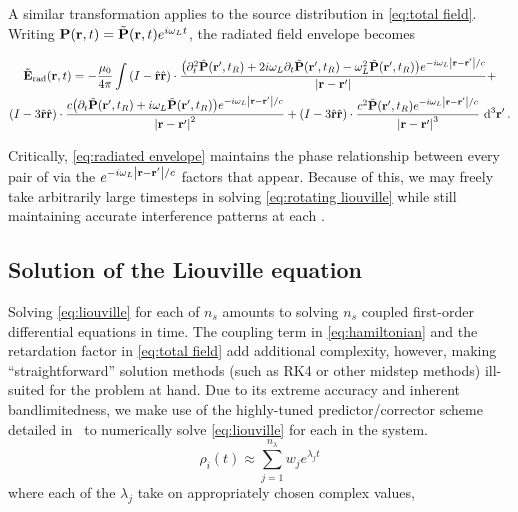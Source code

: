 A similar transformation applies to the source distribution in \cref{eq:total field}.
Writing $\vb{P}(\vb{r}, t) = \tilde{\vb{P}}(\vb{r}, t)e^{i \omega_L t}$, the radiated field envelope becomes
\begin{widetext}
\begin{equation}
  \begin{gathered}
    \tilde{\vb{E}}_\text{rad}(\vb{r}, t) = -\frac{\mu_0}{4\pi} \int 
    \qty(I -  \hat{\vb{r}}\hat{\vb{r}}) \cdot \frac{\qty(\partial_t^2 \tilde{\vb{P}}(\vb{r}', t_R) + 2 i \omega_L \partial_t \tilde{\vb{P}}(\vb{r}', t_R) - \omega_L^2 \tilde{\vb{P}}(\vb{r}', t_R)) e^{-i \omega_L \abs{\vb{r} - \vb{r}'}/c}}{\abs{\vb{r}-\vb{r}'}} + \\
    \qty(I - 3\hat{\vb{r}}\hat{\vb{r}}) \cdot \frac{c\qty(\partial_t \tilde{\vb{P}}(\vb{r}', t_R) + i \omega_L \tilde{\vb{P}}(\vb{r}', t_R))e^{-i \omega_L \abs{\vb{r} - \vb{r}'}/c}}{\abs{\vb{r}-\vb{r}'}^2} +
    \qty(I - 3\hat{\vb{r}}\hat{\vb{r}}) \cdot \frac{c^2   \tilde{\vb{P}}(\vb{r}', t_R)e^{-i \omega_L \abs{\vb{r} - \vb{r}'}/c}}{\abs{\vb{r}-\vb{r}'}^3}
    \, \dd[3]{\vb{r'}}.
  \end{gathered}
  \label{eq:radiated envelope}
\end{equation}
\end{widetext}
Critically, \cref{eq:radiated envelope} maintains the phase relationship between every pair of \qds{} via the $e^{-i \omega_L \abs{\vb{r} - \vb{r}'}/c}$ factors that appear.
Because of this, we may freely take arbitrarily large timesteps in solving \cref{eq:rotating liouville} while still maintaining accurate interference patterns at each \qd{}.




\subsection{Solution of the Liouville equation}

Solving \cref{eq:liouville} for each of $n_s$ \qds{} amounts to solving $n_s$ coupled first-order differential equations in time.
The coupling term in \cref{eq:hamiltonian} and the retardation factor in \cref{eq:total field} add additional complexity, however, making ``straightforward'' solution methods (such as RK4 or other midstep methods) ill-suited for the problem at hand.
Due to its extreme accuracy and inherent bandlimitedness, we make use of the highly-tuned predictor/corrector scheme detailed in~\cite{Glaser2009} to numerically solve \cref{eq:liouville} for each \qd{} in the system.
\begin{equation}
  \rho_i(t) \approx \sum_{j = 1}^{n_\lambda} w_j e^{\lambda_j t}
\end{equation}
where each of the $\lambda_j$ take on appropriately chosen complex values, 

